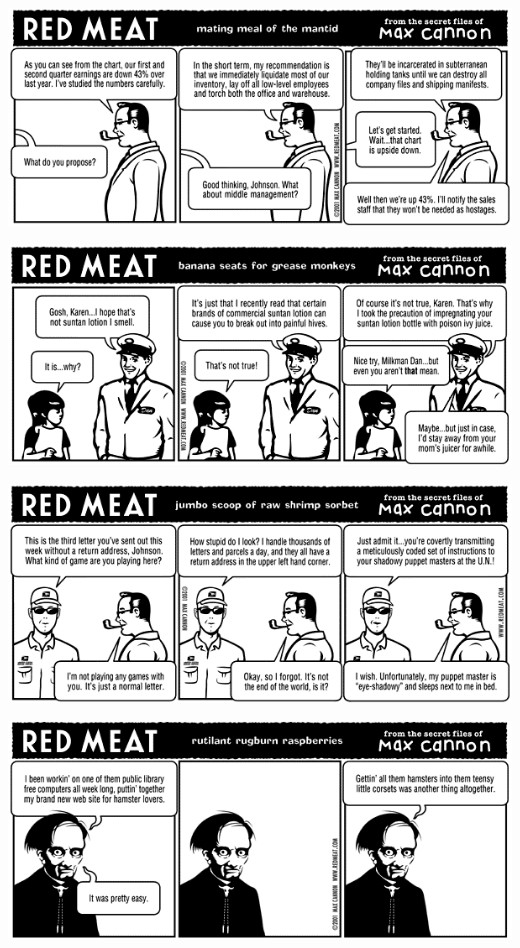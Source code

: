 \documentclass[a4paper,twoside,11pt]{article}
\begin{document}
\includegraphics[width=\textwidth]{redmeat_2001-07-10.png}



\includegraphics[width=\textwidth]{redmeat_2001-07-17.png}



\includegraphics[width=\textwidth]{redmeat_2001-07-24.png}



\includegraphics[width=\textwidth]{redmeat_2001-07-31.png}
\end{document}
